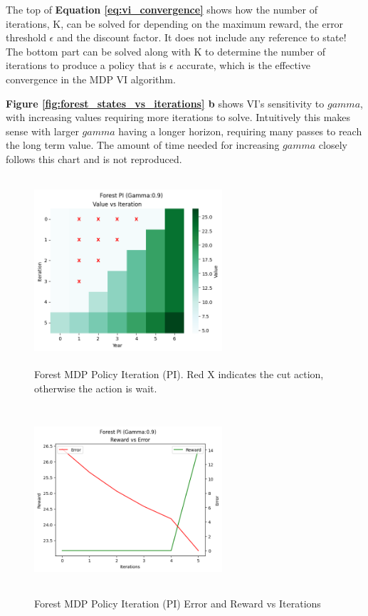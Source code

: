 \documentclass[letterpaper]{article} %
\begin{document}
The top of \textbf{Equation \ref{eq:vi_convergence}} shows how the number of iterations, K, can be solved for depending on the maximum reward, the error threshold $\epsilon$ and the discount factor. It does not include any reference to state!  The bottom part can be solved along with K to determine the number of iterations to produce a policy that is $\epsilon$ accurate, which is the effective convergence in the MDP VI algorithm.  
 
\textbf{Figure \ref{fig:forest_states_vs_iterations} b} shows VI's sensitivity to $gamma$, with increasing values requiring more iterations to solve.  Intuitively this makes sense with larger $gamma$ having a longer horizon, requiring many passes to reach the long term value.  The amount of time needed for increasing $gamma$ closely follows this chart and is not reproduced. 


\begin{figure}[!htb]
\centering
\includegraphics[width=2.75in, height=2.75in]{Figures/Forest_PI_Gamma_0_9_Value_vs_Iteration.png}
\caption{Forest MDP Policy Iteration (PI). Red X indicates the cut action, otherwise the action is wait. }
\label{fig:forest_pi}
\end{figure}

\begin{figure}[!htb]
\centering
\includegraphics[width=2.75in, height=2.75in]{Figures/Forest_PI_Gamma_0_9_Reward_vs_Error.png}
\caption{Forest MDP Policy Iteration (PI) Error and Reward vs Iterations}
\label{fig:forest_pi_reward_error}
\end{figure}
\end{document}
